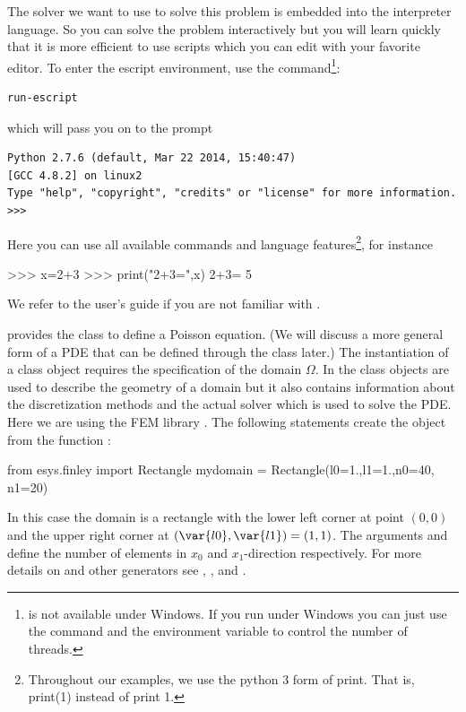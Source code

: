 The \escript solver we want to use to solve this problem is embedded into the \PYTHON interpreter language.
So you can solve the problem interactively but you will learn quickly that it
is more efficient to use scripts which you can edit with your favorite editor.
To enter the escript environment, use the 
command\footnote{ is not available under Windows.
If you run under Windows you can just use the  command and the
 environment variable to control the number of threads.}:
\begin{verbatim}
run-escript
\end{verbatim}
which will pass you on to the \PYTHON prompt
\begin{verbatim}
Python 2.7.6 (default, Mar 22 2014, 15:40:47) 
[GCC 4.8.2] on linux2
Type "help", "copyright", "credits" or "license" for more information.
>>> 
\end{verbatim}
Here you can use all available \PYTHON commands and language features\footnote{Throughout our examples, we use the python 3 form of 
print. That is, print(1) instead of print 1.}, for instance
\begin{python}
  >>> x=2+3
  >>> print("2+3=",x)
  2+3= 5
\end{python}
We refer to the \PYTHON user's guide if you are not familiar with \PYTHON.

\escript provides the class \Poisson to define a Poisson equation.
(We will discuss a more general form of a PDE 
that can be defined through the \LinearPDE class later.)
The instantiation of a \Poisson class object requires the specification of the domain $\Omega$.
In \escript the \Domain class objects are used to describe the geometry of a
domain but it also contains information about the discretization methods and
the actual solver which is used to solve the PDE.
Here we are using the FEM library \finley.
The following statements create the \Domain object  from the 
\finley function :
\begin{python}
  from esys.finley import Rectangle
  mydomain = Rectangle(l0=1.,l1=1.,n0=40, n1=20)
\end{python}
In this case the domain is a rectangle with the lower left corner at point $(0,0)$
and the upper right corner at $(\var{l0},\var{l1})=(1,1)$.
The arguments  and  define the number of elements in $x_{0}$ and
$x_{1}$-direction respectively. For more details on  and
other \Domain generators see , , and
.

